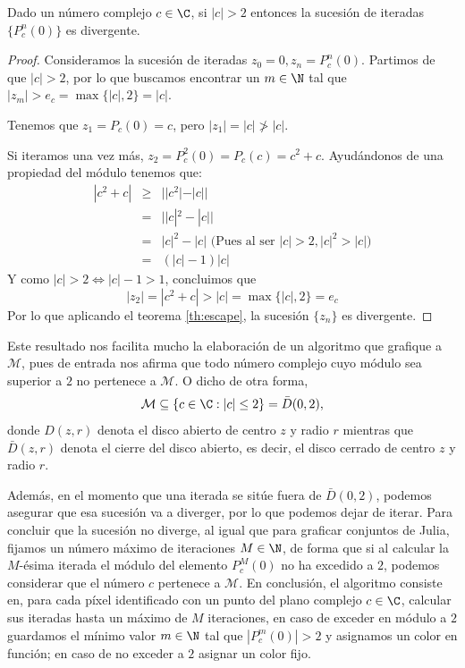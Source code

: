 \begin{proposicion}
  \label{prop:mandelbrot-escape}
  Dado un número complejo $c\in\C$, si $|c|>2$ entonces la sucesión de iteradas $\{P_c^n(0)\}$ es divergente.
\end{proposicion}
\begin{proof}
  Consideramos la sucesión de iteradas $z_0 = 0, z_n=P_c^n(0)$. Partimos de que $|c|>2$, por lo que buscamos encontrar un $m\in\N$ tal que $|z_m|>e_c=\max\{|c|,2\}=|c|$.
  
  Tenemos que $z_1=P_c(0)=c$, pero $|z_1|=|c|\not>|c|$.
  
  Si iteramos una vez más, $z_2=P_c^2(0)=P_c(c)=c^2+c$. Ayudándonos de una propiedad del módulo tenemos que:
  \begin{eqnarray*}
    |c^2+c| & \geq & ||c^2|-|c|| \\
            & = & ||c|^2 -|c|| \\
            & = & |c|^2-|c| \text{ (Pues al ser } |c|>2, |c|^2>|c|) \\
            & = & (|c|-1)|c| 
  \end{eqnarray*}
  Y como $|c|>2\Leftrightarrow |c|-1>1$, concluimos que
  $$
  |z_2|=|c^2+c| > |c| = \max\{|c|,2\} = e_c
  $$
  Por lo que aplicando el teorema \ref{th:escape}, la sucesión $\{z_n\}$ es divergente.
\end{proof}

Este resultado nos facilita mucho la elaboración de un algoritmo que grafique a $\mathcal{M}$, pues de entrada nos afirma que todo número complejo cuyo módulo sea superior a $2$ no pertenece a $\mathcal M$. O dicho de otra forma, 
$$
\mathcal{M}\subseteq \{c\in\C: |c|\leq 2\} = \bar D(0,2),
$$
donde $D(z,r)$ denota el disco abierto de centro $z$ y radio $r$ mientras que $\bar D(z,r)$ denota el cierre del disco abierto, es decir, el disco cerrado de centro $z$ y radio $r$.

Además, en el momento que una iterada se sitúe fuera de $\bar D(0,2)$, podemos asegurar que esa sucesión va a diverger, por lo que podemos dejar de iterar. Para concluir que la sucesión no diverge, al igual que para graficar conjuntos de Julia, fijamos un número máximo de iteraciones $M\in\N$, de forma que si al calcular la $M$-ésima iterada el módulo del elemento $P_c^{M}(0)$ no ha excedido a $2$, podemos considerar que el número $c$ pertenece a $\mathcal{M}$. En conclusión, el algoritmo consiste en, para cada píxel identificado con un punto del plano complejo $c\in\C$, calcular sus iteradas hasta un máximo de $M$ iteraciones, en caso de exceder en módulo a $2$ guardamos el mínimo valor $m\in\N$ tal que $|P_c^m(0)|>2$ y asignamos un color en función; en caso de no exceder a $2$ asignar un color fijo.

